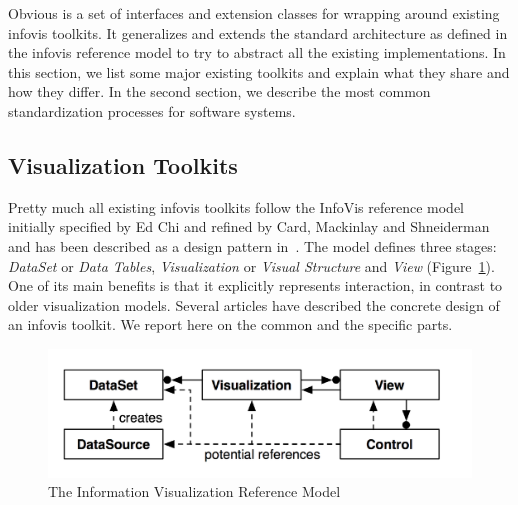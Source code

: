 Obvious is a set of interfaces and extension classes for wrapping
around existing infovis toolkits.  It generalizes and extends the
standard architecture as defined in the infovis reference model to try
to abstract all the existing implementations.  In this section, we
list some major existing toolkits and explain what they share and how
they differ.  In the second section, we describe the most common
standardization processes for software systems.

\subsection{Visualization Toolkits}

Pretty much all existing infovis toolkits follow the
InfoVis reference model initially specified by Ed Chi and refined by
Card, Mackinlay and Shneiderman~\cite{ChiRefModel,ReadingsIV} and has
been described as a design pattern in~\cite{DesignPatternsIV}.  The
model defines three stages: \emph{DataSet} or \emph{Data Tables},
\emph{Visualization} or \emph{Visual Structure} and \emph{View}
(Figure~\ref{fig:refmodel}).  One of its main benefits is that it
explicitly represents interaction, in contrast to older visualization
models.  Several articles have described the concrete design of an
infovis toolkit.  We report here on the common and
the specific parts.

\begin{figure}
\includegraphics[width=\columnwidth]{figures/refmodpat}
\caption{The Information Visualization Reference Model~\cite{DesignPatternsIV}}
\label{fig:refmodel}
\end{figure}


